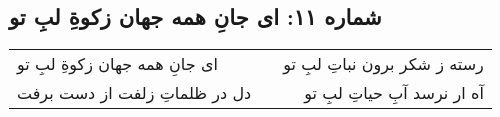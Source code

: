 \begin{center}
\section*{شماره ۱۱: ای جانِ همه جهان زکوةِ لبِ تو}
\label{sec:011}
\begin{longtable}{l p{0.5cm} r}
ای جانِ همه جهان زکوةِ لبِ تو
&&
رسته ز شکر برون نباتِ لبِ تو
\\
دل در ظلماتِ زلفت از دست برفت
&&
آه ار نرسد آبِ حیاتِ لبِ تو
\\
\end{longtable}
\end{center}

